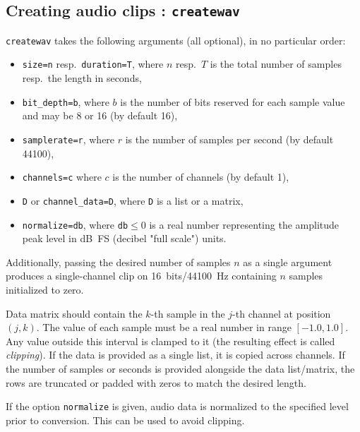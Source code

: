 \documentclass[a4paper,11pt]{book}
\begin{document}
\subsection{Creating audio clips : {\tt createwav}}
{\tt createwav} takes the following arguments (all optional), in no particular order:
\begin{itemize}
  \item {\tt size=n} resp.~{\tt duration=T}, where $n$ resp.~$T$ is the total number of samples resp.~the length in seconds,
  \item {\tt bit\_depth=b}, where $b$ is the number of bits reserved for each sample value and may be 8 or 16 (by default 16),
  \item {\tt samplerate=r}, where $r$ is the number of samples per second (by default 44100),
  \item {\tt channels=c} where $c$ is the number of channels (by default 1),
  \item {\tt D} or {\tt channel\_data=D}, where {\tt D} is a list or a matrix,
  \item {\tt normalize=db}, where {\tt db}$\leq 0$ is a real number representing the amplitude peak level in dB~FS (decibel "full scale") units.
\end{itemize}
Additionally, passing the desired number of samples $n$ as a single argument produces a single-channel clip on 16~bits/44100~Hz containing $n$ samples initialized to zero.

Data matrix should contain the $k$-th sample in the $j$-th channel at position $(j,k)$. The value of each sample must be a real number in range $[-1.0,1.0]$. Any value outside this interval is clamped to it (the resulting effect is called \emph{clipping}). If the data is provided as a single list, it is copied across channels. If the number of samples or seconds is provided alongside the data list/matrix, the rows are truncated or padded with zeros to match the desired length.

If the option {\tt normalize} is given, audio data is normalized to the specified level prior to conversion. This can be used to avoid clipping.
\end{document}
